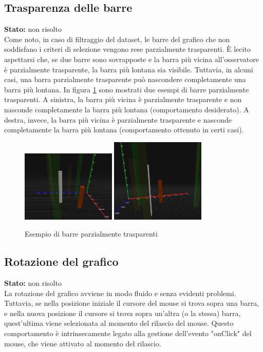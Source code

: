 \subsection{Trasparenza delle barre}
\textbf{Stato:} non risolto\\
Come noto, in caso di filtraggio del dataset, le barre del grafico
che non soddisfano i criteri di selezione vengono rese parzialmente trasparenti.
È lecito aspettarsi che, se due barre sono sovrapposte e la barra più vicina all'osservatore
è parzialmente trasparente, la barra più lontana sia visibile. Tuttavia, in alcuni casi,
una barra parzialmente trasparente può nascondere completamente una barra più lontana.
In figura \ref{fig:trasparenza} sono mostrati due esempi di barre parzialmente trasparenti.
A sinistra, la barra più vicina è parzialmente trasparente e non nasconde
completamente la barra più lontana (comportamento desiderato). A destra, invece,
la barra più vicina è parzialmente trasparente e nasconde completamente la barra 
più lontana (comportamento ottenuto in certi casi).
\begin{figure}[h!]
    \centering
    \includegraphics[width=0.4\textwidth]{template/images/barreok.png}
    \hspace{0.5cm}
    \includegraphics[width=0.4\textwidth]{template/images/barre.png}
    \caption{Esempio di barre parzialmente trasparenti}
    \label{fig:trasparenza}
\end{figure}

\subsection{Rotazione del grafico}
\textbf{Stato:} non risolto\\
La rotazione del grafico avviene in modo fluido e senza evidenti problemi. Tuttavia,
se nella posizione iniziale il cursore del mouse si trova sopra una barra, e
nella nuova posizione il cursore si trova sopra un'altra (o la stessa) barra,
quest'ultima viene selezionata al momento del rilascio del mouse.
Questo comportamento è intrinsecamente legato alla
gestione dell'evento "onClick" del mouse, che viene attivato al momento del rilascio.